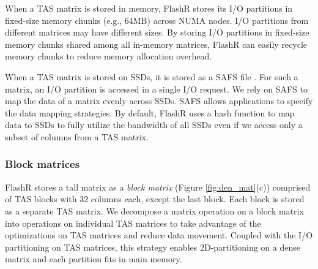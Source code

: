 When a TAS matrix is stored in memory, FlashR stores its I/O partitions in
fixed-size memory chunks (e.g., 64MB) across NUMA nodes.
I/O partitions from different matrices may have different sizes. By storing
I/O partitions in fixed-size memory chunks shared among all in-memory matrices,
FlashR can easily recycle memory chunks to reduce memory allocation overhead.

When a TAS matrix is stored on SSDs, it is stored as a SAFS file \cite{safs}.
For such a matrix, an I/O partition is accessed in a single I/O request.
We rely on SAFS to map the data of a matrix evenly across SSDs. SAFS allows
applications to specify the data mapping strategies. By default, FlashR uses
a hash function to map data to SSDs to fully utilize the bandwidth of all SSDs
even if we access only a subset of columns from a TAS matrix.

\subsubsection{Block matrices} \label{sec:block_mat}
FlashR stores a tall matrix as a \textit{block matrix}
(Figure \ref{fig:den_mat}(c)) comprised of TAS blocks with $32$ columns each,
except the last block. Each block is stored as a separate TAS matrix.
We decompose a matrix operation
on a block matrix into operations on individual TAS matrices to take advantage
of the optimizations on TAS matrices and reduce data movement.
Coupled with the I/O partitioning on TAS matrices, this strategy enables
2D-partitioning on a dense matrix and each partition fits in main memory.



